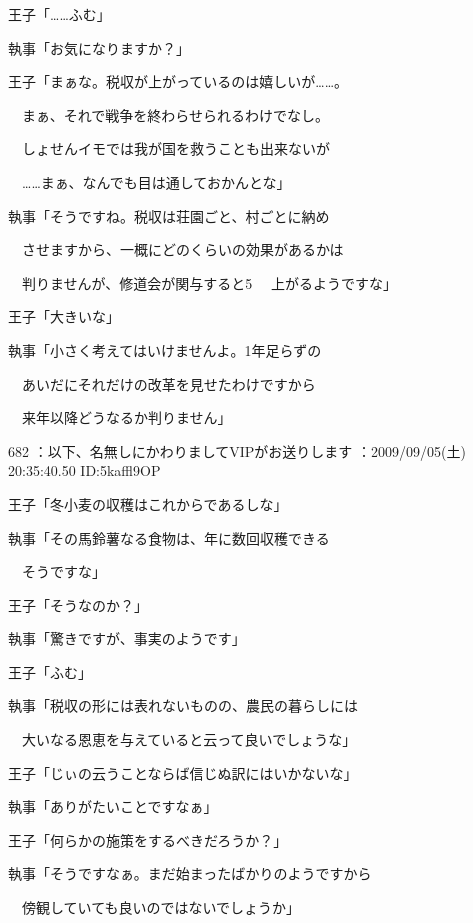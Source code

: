 \documentclass[a4j,twocolumn]{tarticle}
\begin{document}
王子「……ふむ」\par{} 
執事「お気になりますか？」 



王子「まぁな。税収が上がっているのは嬉しいが……。\par{} 
　まぁ、それで戦争を終わらせられるわけでなし。\par{} 
　しょせんイモでは我が国を救うことも出来ないが\par{} 
　……まぁ、なんでも目は通しておかんとな」 



執事「そうですね。税収は荘園ごと、村ごとに納め\par{} 
　させますから、一概にどのくらいの効果があるかは\par{} 
　判りませんが、修道会が関与すると5%
　上がるようですな」 



王子「大きいな」\par{} 
執事「小さく考えてはいけませんよ。1年足らずの\par{} 
　あいだにそれだけの改革を見せたわけですから\par{} 
　来年以降どうなるか判りません」 

	
    
    

682 ：以下、名無しにかわりましてVIPがお送りします ：2009/09/05(土) 20:35:40.50 ID:5kaffl9OP 


王子「冬小麦の収穫はこれからであるしな」\par{} 
執事「その馬鈴薯なる食物は、年に数回収穫できる\par{} 
　そうですな」 



王子「そうなのか？」\par{} 
執事「驚きですが、事実のようです」 



王子「ふむ」\par{} 
執事「税収の形には表れないものの、農民の暮らしには\par{} 
　大いなる恩恵を与えていると云って良いでしょうな」 



王子「じぃの云うことならば信じぬ訳にはいかないな」\par{} 
執事「ありがたいことですなぁ」 



王子「何らかの施策をするべきだろうか？」\par{} 
執事「そうですなぁ。まだ始まったばかりのようですから\par{} 
　傍観していても良いのではないでしょうか」 
\end{document}
